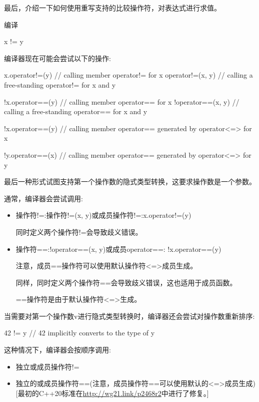 最后，介绍一下如何使用重写支持的比较操作符，对表达式进行求值。



编译

\begin{cpp}
x != y
\end{cpp}

编译器现在可能会尝试以下的操作:

\begin{cpp}
x.operator!=(y) // calling member operator!= for x
operator!=(x, y) // calling a free-standing operator!= for x and y

!x.operator==(y) // calling member operator== for x
!operator==(x, y) // calling a free-standing operator== for x and y

!x.operator==(y) // calling member operator== generated by operator<=> for x

!y.operator==(x) // calling member operator== generated by operator<=> for y
\end{cpp}

最后一种形式试图支持第一个操作数的隐式类型转换，这要求操作数是一个参数。

通常，编译器会尝试调用:

\begin{itemize}
\item
操作符!=:操作符!=(x, y)或成员操作符!=:x.operator!=(y)

同时定义两个操作符!=会导致歧义错误。

\item
操作符==:!operator==(x, y)或成员operator==: !x.operator==(y)

注意，成员==操作符可以使用默认操作符<=>成员生成。

同样，同时定义两个操作符==会导致歧义错误，这也适用于成员函数。

==操作符是由于默认操作符<=>生成。
\end{itemize}

当需要对第一个操作数v进行隐式类型转换时，编译器还会尝试对操作数重新排序:

\begin{cpp}
42 != y // 42 implicitly converts to the type of y
\end{cpp}

这种情况下，编译器会按顺序调用:

\begin{itemize}
\item
独立或成员操作符!=

\item
独立的或成员操作符==(注意，成员操作符==可以使用默认的<=>成员生成)[最初的C++20标准在\url{http://wg21.link/p2468r2}中进行了修复。]
\end{itemize}

